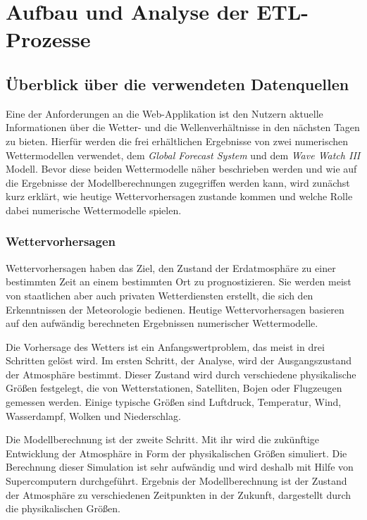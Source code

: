 
\chapter{Aufbau und Analyse der ETL-Prozesse}

\section{Überblick über die verwendeten Datenquellen}
Eine der Anforderungen an die Web-Applikation ist den Nutzern aktuelle
Informationen über die Wetter- und die Wellenverhältnisse in den
nächsten Tagen zu bieten. Hierfür werden die frei erhältlichen
Ergebnisse von zwei numerischen Wettermodellen verwendet, dem
\textit{Global Forecast System} und dem \textit{Wave Watch III}
Modell. Bevor diese beiden Wettermodelle näher beschrieben werden und
wie auf die Ergebnisse der Modellberechnungen zugegriffen werden kann,
wird zunächst kurz erklärt, wie heutige Wettervorhersagen zustande
kommen und welche Rolle dabei numerische Wettermodelle spielen.

\subsection{Wettervorhersagen}
Wettervorhersagen haben das Ziel, den Zustand der Erdatmosphäre zu
einer bestimmten Zeit an einem bestimmten Ort zu prognostizieren. Sie
werden meist von staatlichen aber auch privaten Wetterdiensten
erstellt, die sich den Erkenntnissen der Meteorologie
bedienen. Heutige Wettervorhersagen basieren auf den aufwändig
berechneten Ergebnissen numerischer Wettermodelle.

Die Vorhersage des Wetters ist ein Anfangswertproblem, das meist in
drei Schritten gelöst wird. Im ersten Schritt, der Analyse, wird der
Ausgangszustand der Atmosphäre bestimmt. Dieser Zustand wird durch
verschiedene physikalische Größen festgelegt, die von Wetterstationen,
Satelliten, Bojen oder Flugzeugen gemessen werden. Einige typische
Größen sind Luftdruck, Temperatur, Wind, Wasserdampf, Wolken und
Niederschlag.

Die Modellberechnung ist der zweite Schritt. Mit ihr wird die
zukünftige Entwicklung der Atmosphäre in Form der physikalischen
Größen simuliert. Die Berechnung dieser Simulation ist sehr aufwändig
und wird deshalb mit Hilfe von Supercomputern durchgeführt. Ergebnis
der Modellberechnung ist der Zustand der Atmosphäre zu verschiedenen
Zeitpunkten in der Zukunft, dargestellt durch die physikalischen
Größen.

